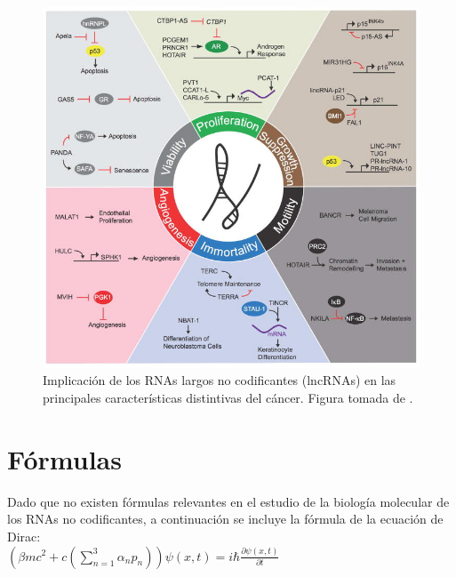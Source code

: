 \documentclass[a4paper,11pt]{article}
\begin{document}
\begin{figure}[h!]
\includegraphics{figuras/hallmarks.jpg}
\caption{Implicación de los RNAs largos no codificantes (lncRNAs) en las principales características distintivas del cáncer. Figura tomada de \cite{Schmitt2016}.}
\label{fig:hallmarks}
\end{figure}


\section{Fórmulas}

Dado que no existen fórmulas relevantes en el estudio de la biología molecular de los RNAs no codificantes, a continuación se incluye la fórmula de la ecuación de Dirac:\\
$(\beta m c^2 + c (\sum_{n=1}^3\alpha_n p_n)) \psi(x,t) = i\hbar \frac{\partial \psi(x,t)}{\partial t}$\\




\end{document}
